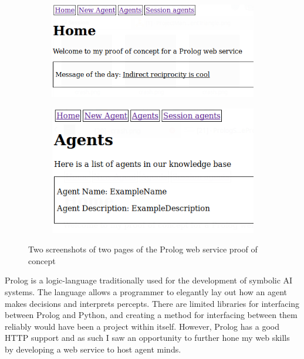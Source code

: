 \documentclass[]{final_report}
\begin{document}
\begin{figure}
\begin{framed}
\begin{subfigure}{.55\textwidth}
	\begin{center}
	\includegraphics[width=\linewidth]{PrologServiceProof1.png}
	\end{center}
\end{subfigure}
\begin{subfigure}{.45\textwidth}
	\begin{center}
	\includegraphics[width=\linewidth]{PrologServiceProof2.png}
	\end{center}
\end{subfigure}
\end{framed}
\caption{Two screenshots of two pages of the Prolog web service proof of concept}
\label{fig:prologproof}
\end{figure}
Prolog is a logic-language traditionally used for the development of symbolic AI systems. The language allows a programmer to elegantly lay out how an agent makes decisions and interprets percepts. There are limited libraries for interfacing between Prolog and Python, and creating a method for interfacing between them reliably would have been a project within itself. However, Prolog has a good HTTP support and as such I saw an opportunity to further hone my web skills by developing a web service to host agent minds.\par 
\end{document}
